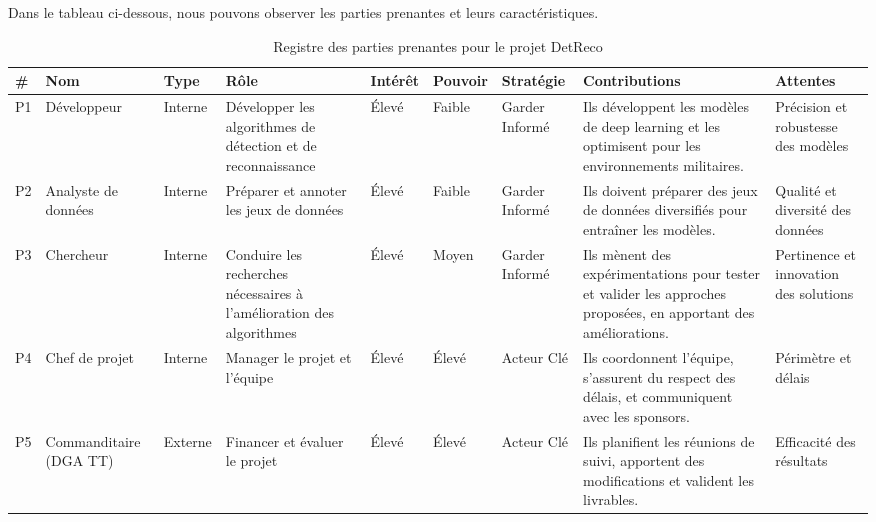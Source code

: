 Dans le tableau ci-dessous, nous pouvons observer les parties prenantes et leurs caractéristiques.

\begin{table}[H]
    \centering
    \scriptsize
    \begin{tabular}{|p{0.3cm}|p{1.9cm}|p{0.9cm}|p{2.5cm}|p{0.9cm}|p{1cm}|p{1.5cm}|p{2.7cm}|p{2.3cm}|}
        \hline
        \rowcolor{green} \textbf{\#} & \textbf{Nom}           & \textbf{Type} & \textbf{Rôle}                                                        & \textbf{Intérêt} & \textbf{Pouvoir} & \textbf{Stratégie} & \textbf{Contributions}                                                                                          & \textbf{Attentes}                      \\
        \hline
        P1                           & Développeur            & Interne       & Développer les algorithmes de détection et de reconnaissance         & Élevé            & Faible           & Garder Informé     & Ils développent les modèles de deep learning et les optimisent pour les environnements militaires.              & Précision et robustesse des modèles    \\
        \hline
        P2                           & Analyste de données    & Interne       & Préparer et annoter les jeux de données                              & Élevé            & Faible           & Garder Informé     & Ils doivent préparer des jeux de données diversifiés pour entraîner les modèles.                                & Qualité et diversité des données       \\
        \hline
        P3                           & Chercheur              & Interne       & Conduire les recherches nécessaires à l'amélioration des algorithmes & Élevé            & Moyen            & Garder Informé     & Ils mènent des expérimentations pour tester et valider les approches proposées, en apportant des améliorations. & Pertinence et innovation des solutions \\
        \hline
        P4                           & Chef de projet         & Interne       & Manager le projet et l'équipe                                        & Élevé            & Élevé            & Acteur Clé         & Ils coordonnent l'équipe, s'assurent du respect des délais, et communiquent avec les sponsors.                  & Périmètre et délais                    \\
        \hline
        P5                           & Commanditaire (DGA TT) & Externe       & Financer et évaluer le projet                                        & Élevé            & Élevé            & Acteur Clé         & Ils planifient les réunions de suivi, apportent des modifications et valident les livrables.                    & Efficacité des résultats               \\
        \hline
    \end{tabular}
    \caption{Registre des parties prenantes pour le projet DetReco}
\end{table}


